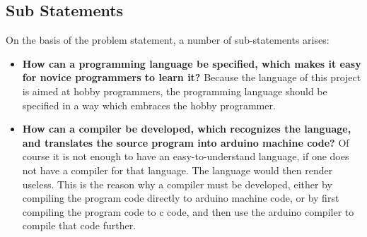 \subsection{Sub Statements}
On the basis of the problem statement, a number of sub-statements arises:
\begin{itemize}
	\item \textbf{How can a programming language be specified, which makes it easy for novice programmers to learn it?} Because the language of this project is aimed at hobby programmers, the programming language should be specified in a way which embraces the hobby programmer.
	\item \textbf{How can a compiler be developed, which recognizes the language, and translates the source program into arduino machine code?} Of course it is not enough to have an easy-to-understand language, if one does not have a compiler for that language. The language would then render useless. This is the reason why a compiler must be developed, either by compiling the program code directly to arduino machine code, or by first compiling the program code to c code, and then use the arduino compiler to compile that code further. 
\end{itemize}